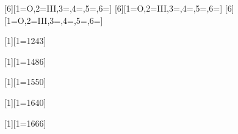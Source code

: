 
\usepackage{amsmath}	%
\usepackage{textgreek}
\usepackage{xargs}
\usepackage{xspace}

\let\oldAA\AA
\renewcommand{\AA}{\text{\oldAA}\xspace}
\newcommand{\mum}{\text{\textmu m}\xspace}

\newcommand{\Lyalpha}{\text{Ly\,\textalpha}\xspace}
\newcommand{\Halpha}{\text{H\,\textalpha}\xspace}
\newcommand{\Hbeta}{\text{H\,\textbeta}\xspace}
\newcommand{\Hgamma}{\text{H\,\textgamma}\xspace}
\newcommand{\Hdelta}{\text{H\,\textdelta}\xspace}
\newcommand{\Paalpha}{\text{Pa\,\textalpha}\xspace}
\newcommand{\Pabeta}{\text{Pa\,\textbeta}\xspace}
\newcommand{\Hepsilon}{\text{H\,\textepsilon}\xspace}

[6][1=O,2=III,3=,4=,5=,6=]{\xspace}
[6][1=O,2=III,3=,4=,5=,6=]{\text{{#1}\,{\sc{#2}}]{#3}{#4}{#5}{#6}}\xspace}
[6][1=O,2=III,3=,4=,5=,6=]{\xspace}

\newcommand{\HI}{\permittedEL[H][i]}
\newcommand{\HII}{\permittedEL[H][ii]}

\newcommand{\NV}{\permittedEL[N][v]}
[1][1=1243]{\permittedEL[N][v][\textlambda][#1]}


\newcommand{\NIV}{\semiforbiddenEL[N][iv]}
[1][1=1486]{\semiforbiddenEL[N][iv][\textlambda][#1]}

\newcommand{\CIV}{\permittedEL[C][iv]}
[1][1=1550]{\permittedEL[C][iv][\textlambda][#1]}
\newcommand{\CIVall}{\permittedEL[C][iv][\textlambda][\textlambda][1548,][1551]}

\newcommand{\HeII}{\permittedEL[He][ii]}
[1][1=1640]{\permittedEL[He][ii][\textlambda][#1]}

\newcommand{\semiOIII}{\semiforbiddenEL[O][iii]}
[1][1=1666]{\semiforbiddenEL[O][iii][\textlambda][#1]}
\newcommand{\semiOIIIall}{\semiforbiddenEL[O][iii][\textlambda][\textlambda][1661,][1666]}

